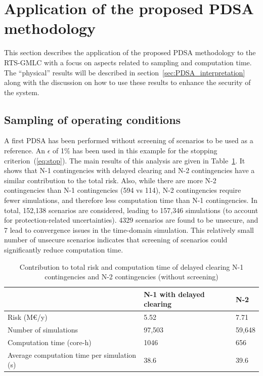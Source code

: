 \section{Application of the proposed PDSA methodology}
\label{sec:PDSA_results}

This section describes the application of the proposed PDSA methodology to the RTS-GMLC with a focus on aspects related to sampling and computation time. The ``physical'' results will be described in section~\ref{sec:PDSA_interpretation} along with the discussion on how to use these results to enhance the security of the system.



\subsection{Sampling of operating conditions}
\label{sec:PDSA_results_sampling}

A first PDSA has been performed without screening of scenarios to be used as a reference. An \(\epsilon\) of 1\% has been used in this example for the stopping criterion~(\ref{eq:stop}). The main results of this analysis are given in Table~\ref{tab:summary-N1N2}. It shows that N-1 contingencies with delayed clearing and N-2 contingencies have a similar contribution to the total risk. Also, while there are more N-2 contingencies than N-1 contingencies (594 vs 114), N-2 contingencies require fewer simulations, and therefore less computation time than N-1 contingencies. In total, 152,138 scenarios are considered, leading to 157,346 simulations (to account for protection-related uncertainties). 4329 scenarios are found to be unsecure, and 7 lead to convergence issues in the time-domain simulation. This relatively small number of unsecure scenarios indicates that screening of scenarios could significantly reduce computation time.

\begin{table}
\centering
\caption{Contribution to total risk and computation time of delayed clearing N-1 contingencies and N-2 contingencies (without screening)}
\label{tab:summary-N1N2}
\begin{tabular}{@{}lll@{}}
\toprule
                                 & N-1 with delayed clearing  & N-2 \\ \midrule
Risk (M€/y) & 5.52 & 7.71 \\
Number of simulations            & 97,503 & 59,648 \\
Computation time (core-h)        & 1046  & 656 \\
Average computation time per simulation (s) & 38.6 & 39.6 \\ \bottomrule
\end{tabular}
\end{table}



